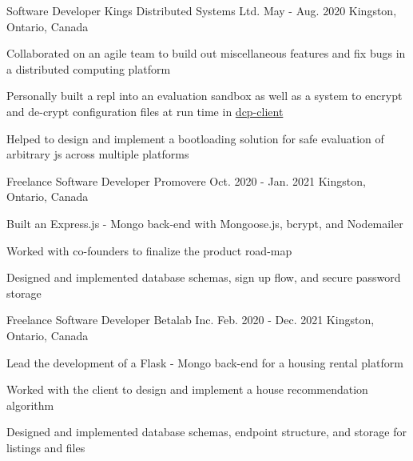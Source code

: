 

\begin{cventries}

  \cventry
    {Software Developer} %
    {Kings Distributed Systems Ltd.} %
    {May - Aug. 2020} %
    {Kingston, Ontario, Canada} %
    {
      \begin{cvitems} %
        \item{Collaborated on an agile team to build out miscellaneous features and fix bugs in a distributed computing platform}
        \item{Personally built a repl into an evaluation sandbox as well as a system to encrypt and de-crypt configuration files at run time in \href{https://www.npmjs.com/package/dcp-client}{dcp-client}}
        \item{Helped to design and implement a bootloading solution for safe evaluation of arbitrary js across multiple platforms}
      \end{cvitems}
    }

  \cventry
    {Freelance Software Developer} %
    {Promovere} %
    {Oct. 2020 - Jan. 2021} %
    {Kingston, Ontario, Canada} %
    {
      \begin{cvitems} %
        \item {Built an Express.js - Mongo back-end with Mongoose.js, bcrypt, and Nodemailer}
        \item{Worked with co-founders to finalize the product road-map}
        \item{Designed and implemented database schemas, sign up flow, and secure password storage}
      \end{cvitems}
    }

  \cventry
    {Freelance Software Developer} %
    {Betalab Inc.} %
    {Feb. 2020 - Dec. 2021} %
    {Kingston, Ontario, Canada} %
    {
      \begin{cvitems} %
        \item {Lead the development of a Flask - Mongo back-end for a housing rental platform} %
        \item{Worked with the client to design and implement a house recommendation algorithm}
        \item{Designed and implemented database schemas, endpoint structure, and storage for listings and files}
      \end{cvitems}
    }


\end{cventries}
